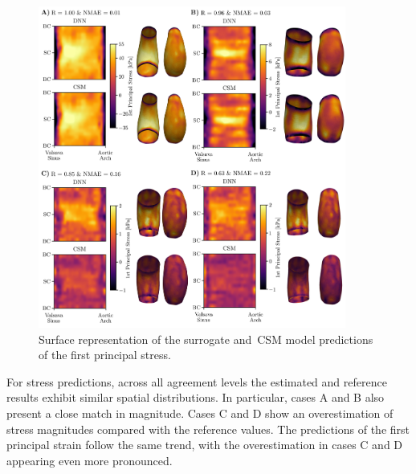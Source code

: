 \documentclass[a4paper,fleqn]{cas-sc}
\begin{document}
    \begin{figure}
      \centering
      \includegraphics[width=0.9\textwidth]{fig4}
      \caption{Surface representation of the surrogate and~\gls{CSM} model predictions of the first principal stress.}
      \label{fig:surface_representationStress}
    \end{figure}
        
    For stress predictions, across all agreement levels the estimated and reference results exhibit similar spatial distributions. In particular, cases A and B also present a close match in magnitude. Cases C and D show an overestimation of stress magnitudes compared with the reference values. The predictions of the first principal strain follow the same trend, with the overestimation in cases C and D appearing even more pronounced.
\end{document}
